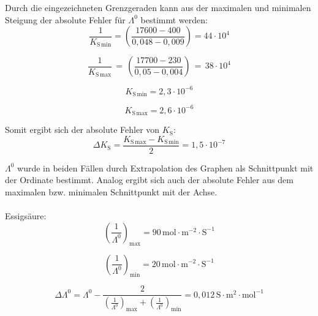 \documentclass[12pt,a4paper,titlepage,headinclude,bibtotoc]{scrartcl}
\begin{document}
Durch die eingezeichneten Grenzgeraden kann aus der maximalen und minimalen Steigung der absolute Fehler für $\Lambda^0$ bestimmt werden:\\


\begin{equation}
\frac{1}{K_{\mathrm{S}\,\mathrm{min}}} =\left( \frac{17600-400}{0,048-0,009} \right)= 44\cdot 10^4
\end{equation}

\begin{equation}
\frac{1}{K_{\mathrm{S}\,\mathrm{max}}}\,=\,\left(\frac{17700-230}{0,05-0,004}\right)\,=\, 38 \cdot 10^4
\end{equation}


\begin{equation}
K_{\mathrm{S}\,\mathrm{min}} = 2,3 \cdot 10^{-6}
\end{equation}

\begin{equation}
K_{\mathrm{S}\,\mathrm{max}} = 2,6 \cdot 10^{-6}
\end{equation}


Somit ergibt sich der absolute Fehler von $K_{\mathrm{S}}$:\\

\begin{equation}
\Delta K_{\mathrm{S}} = \frac{K_{\mathrm{S}\,\mathrm{max}} - K_{\mathrm{S}\,\mathrm{min}}}{2} = 1,5 \cdot 10^{-7}
\end{equation}


$\Lambda^0$ wurde in beiden Fällen durch Extrapolation des Graphen als Schnittpunkt mit der Ordinate bestimmt. Analog ergibt sich auch der absolute Fehler aus dem maximalen bzw. minimalen Schnittpunkt mit der Achse. \\
\\
Essigsäure:\\

\begin{equation}
\left(\frac{1}{\Lambda^0}\right)_\mathrm{max} = 90\, \mathrm{mol \cdot m^{-2} \cdot S^{-1}}
\end{equation}

\begin{equation}
\left(\frac{1}{\Lambda^0}\right)_\mathrm{min} = 20\, \mathrm{mol \cdot m^{-2} \cdot S^{-1}}
\end{equation}

\begin{equation}
\Delta \Lambda^0 = \Lambda^0 - \frac{2}{(\frac{1}{\Lambda^0})_\mathrm{max} + (\frac{1}{\Lambda^0})_\mathrm{min}} = 0,012\, \mathrm{S \cdot m^2 \cdot mol^{-1}}
\end{equation}
\end{document}
